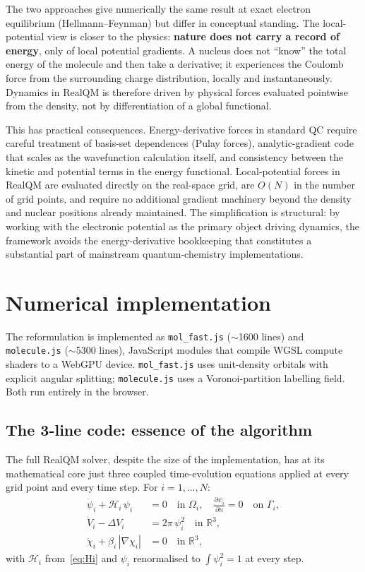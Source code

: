 \documentclass[11pt]{article}
\begin{document}
The two approaches give numerically the same result at exact electron equilibrium (Hellmann--Feynman) but differ in conceptual standing. The local-potential view is closer to the physics: \textbf{nature does not carry a record of energy}, only of local potential gradients. A nucleus does not ``know'' the total energy of the molecule and then take a derivative; it experiences the Coulomb force from the surrounding charge distribution, locally and instantaneously. Dynamics in RealQM is therefore driven by physical forces evaluated pointwise from the density, not by differentiation of a global functional.

This has practical consequences. Energy-derivative forces in standard QC require careful treatment of basis-set dependences (Pulay forces), analytic-gradient code that scales as the wavefunction calculation itself, and consistency between the kinetic and potential terms in the energy functional. Local-potential forces in RealQM are evaluated directly on the real-space grid, are $O(N)$ in the number of grid points, and require no additional gradient machinery beyond the density and nuclear positions already maintained. The simplification is structural: by working with the electronic potential as the primary object driving dynamics, the framework avoids the energy-derivative bookkeeping that constitutes a substantial part of mainstream quantum-chemistry implementations.

\section{Numerical implementation}\label{sec:implementation}

The reformulation is implemented as \texttt{mol\_fast.js} ($\sim$1600 lines) and \texttt{molecule.js} ($\sim$5300 lines), JavaScript modules that compile WGSL compute shaders to a WebGPU device. \texttt{mol\_fast.js} uses unit-density orbitals with explicit angular splitting; \texttt{molecule.js} uses a Voronoi-partition labelling field. Both run entirely in the browser.

\subsection{The 3-line code: essence of the algorithm}\label{sec:3line}

The full RealQM solver, despite the size of the implementation, has at its mathematical core just three coupled time-evolution equations applied at every grid point and every time step. For $i = 1, \ldots, N$:
\begin{align}
\dot{\psi}_i + \mathcal{H}_i\, \psi_i &= 0 \quad\text{in } \Omega_i, \quad \frac{\partial \psi_i}{\partial n} = 0 \quad\text{on } \Gamma_i, \label{eq:3line-psi} \\
\dot{V}_i - \Delta V_i &= 2\pi\, \psi_i^2 \quad\text{in } \mathbb{R}^3, \label{eq:3line-V} \\
\dot{\chi}_i + \beta_i\, |\nabla \chi_i| &= 0 \quad\text{in } \mathbb{R}^3, \label{eq:3line-chi}
\end{align}
with $\mathcal{H}_i$ from~\eqref{eq:Hi} and $\psi_i$ renormalised to $\int \psi_i^2 = 1$ at every step.
\end{document}
